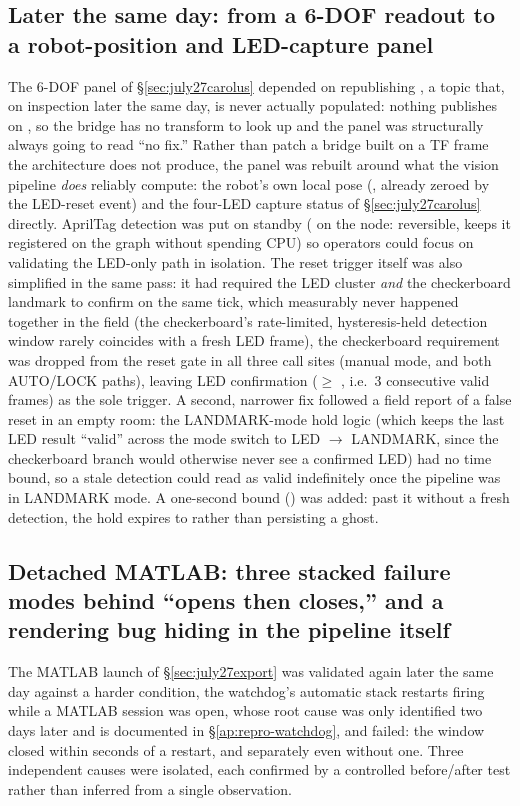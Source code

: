 \subsection{Later the same day: from a 6-DOF readout to a robot-position and
LED-capture panel}
\label{sec:july27carolusrepurpose}
The 6-DOF panel of \S\ref{sec:july27carolus} depended on
 republishing
, a topic that, on inspection later the
same day, is never actually populated: nothing publishes 
on , so the bridge has no transform to look up and the panel was
structurally always going to read ``no fix.'' Rather than patch a bridge
built on a TF frame the architecture does not produce, the panel was rebuilt
around what the vision pipeline \emph{does} reliably compute: the robot's own
local pose (, already zeroed by the LED-reset event) and the
four-LED capture status of \S\ref{sec:july27carolus} directly. AprilTag
detection was put on standby ( on the node: reversible,
keeps it registered on the graph without spending CPU) so operators could
focus on validating the LED-only path in isolation. The reset trigger itself
was also simplified in the same pass: it had required the LED cluster
\emph{and} the checkerboard landmark to confirm on the same tick, which
measurably never happened together in the field (the checkerboard's
rate-limited, hysteresis-held detection window rarely coincides with a fresh
LED frame), the checkerboard requirement was dropped from the reset gate
in all three call sites (manual mode, and both AUTO/LOCK paths), leaving LED
confirmation ($\ge$ , i.e.\ 3 consecutive valid
frames) as the sole trigger. A second, narrower fix followed a field report
of a false reset in an empty room: the LANDMARK-mode hold logic (which keeps
the last LED result ``valid'' across the mode switch to LED $\rightarrow$
LANDMARK, since the checkerboard branch would otherwise never see a
confirmed LED) had no time bound, so a stale detection could read as valid
indefinitely once the pipeline was in LANDMARK mode. A one-second bound
() was added: past it without a fresh detection, the hold
expires to  rather than persisting a ghost.

\subsection{Detached MATLAB: three stacked failure modes behind ``opens then
closes,'' and a rendering bug hiding in the pipeline itself}
\label{sec:july27matlabfix}
The MATLAB launch of \S\ref{sec:july27export} was validated again later the
same day against a harder condition, the watchdog's automatic stack
restarts firing while a MATLAB session was open, whose root cause was
only identified two days later and is documented in
\S\ref{ap:repro-watchdog}, and failed: the window closed within seconds of a restart, and separately
even without one. Three independent causes were isolated, each confirmed by
a controlled before/after test rather than inferred from a single
observation.


